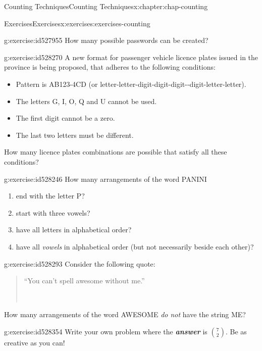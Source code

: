 \documentclass[oneside,10pt,]{book}
\newcommand{\alert}[1]{\textbf{\textit{#1}}}
\numberwithin{equation}{section}
\begin{document}
\begin{chapterptx}{Counting Techniques}{}{Counting Techniques}{}{}{x:chapter:chap-counting}
\begin{exercises-section}{Exercises}{}{Exercises}{}{}{x:exercises:exercises-counting}
\begin{divisionexercise}{2}{}{}{g:exercise:id527955}
How many possible passwords can be created?%
\end{divisionexercise}%
\begin{divisionexercise}{3}{}{}{g:exercise:id528270}%
A new format for passenger vehicle licence plates issued in the province is being proposed, that adheres to the following conditions:%
\begin{itemize}[label=\textbullet]
\item{}Pattern is AB123-4CD (or letter-letter-digit-digit-digit-{}-{}digit-letter-letter).%
\item{}The letters G, I, O, Q and U cannot be used.%
\item{}The first digit cannot be a zero.%
\item{}The last two letters must be different.%
\end{itemize}
How many licence plates combinations are possible that satisfy all these conditions?%
\end{divisionexercise}%
\begin{divisionexercise}{4}{}{}{g:exercise:id528246}%
How many arrangements of the word PANINI%
\begin{enumerate}[label=(\alph*)]
\item{}end with the letter P?%
\item{}start with three vowels?%
\item{}have all letters in alphabetical order?%
\item{}have all \emph{vowels} in alphabetical order (but not necessarily beside each other)?%
\end{enumerate}
%
\end{divisionexercise}%
\begin{divisionexercise}{5}{}{}{g:exercise:id528293}%
Consider the following quote:%
\begin{quote}%
``You can't spell awesome without me.''%
\nopagebreak\par%
\hfill{}\\\par
\end{quote}
How many arrangements of the word AWESOME \emph{do not} have the string ME?%
\end{divisionexercise}%
\begin{divisionexercise}{6}{}{}{g:exercise:id528354}%
Write your own problem where the \alert{answer} is \(\displaystyle\binom{7}{2}\). Be as creative as you can!%

\end{divisionexercise}
\end{exercises-section}
\end{chapterptx}
\end{document}
